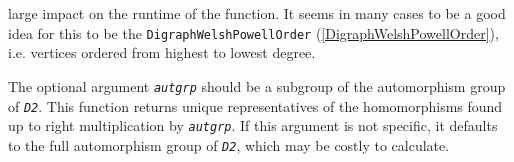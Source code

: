 \documentclass[a4paper,11pt]{report}
\begin{document}
{{{\begin{description}
large impact on the runtime of the function. It seems in many cases to be a
good idea for this to be the \texttt{DigraphWelshPowellOrder} (\ref{DigraphWelshPowellOrder}), i.e. vertices ordered from highest to lowest degree. 
\item[{\mbox{\texttt{\mdseries\slshape aut{\textunderscore}grp}}}]  The optional argument \mbox{\texttt{\mdseries\slshape aut{\textunderscore}grp}} should be a subgroup of the automorphism group of \mbox{\texttt{\mdseries\slshape D2}}. This function returns unique representatives of the homomorphisms found up
to right multiplication by \mbox{\texttt{\mdseries\slshape aut{\textunderscore}grp}}. If this argument is not specific, it defaults to the full automorphism group
of \mbox{\texttt{\mdseries\slshape D2}}, which may be costly to calculate. 
\end{description}
 
}}}
\end{document}
